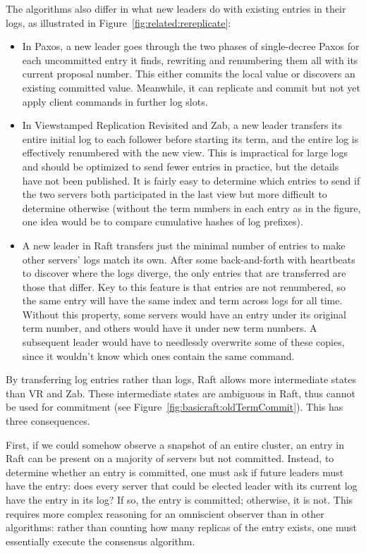 The algorithms also differ in what new leaders do with existing entries
in their logs, as illustrated in Figure~\ref{fig:related:rereplicate}:
%
\begin{itemize}
%
\item In Paxos, a new leader goes through the two phases of
single-decree Paxos for each uncommitted entry it finds, rewriting and
renumbering them all with its current proposal number. This either
commits the local value or discovers an existing committed value.
Meanwhile, it can replicate and commit but not yet apply client commands
in further log slots.
%
\item In Viewstamped Replication Revisited and Zab, a new leader
transfers its entire initial log to each follower before starting its
term, and the entire log is effectively renumbered with the new view.
This is impractical for large logs and should be optimized to send fewer
entries in practice, but the details have not been published. It is
fairly easy to determine which entries to send if the two servers both
participated in the last view but more difficult to determine otherwise
(without the term numbers in each entry as in the figure, one idea would
be to compare cumulative hashes of log prefixes).
%
\item
A new leader in Raft transfers just the minimal number of entries to
make other servers' logs match its own. After some back-and-forth with
heartbeats to discover where the logs diverge, the only entries that are
transferred are those that differ.
%
Key to this feature is that entries are not renumbered, so the same
entry will have the same index and term across logs for all time.
Without this property, some servers would have an entry under its
original term number, and others would have it under new term numbers. A
subsequent leader would have to needlessly overwrite some of these
copies, since it wouldn't know which ones contain the same command.
%
\end{itemize}

By transferring log entries rather than logs, Raft allows more
intermediate states than VR and Zab. These intermediate states
are ambiguous in Raft, thus cannot be used for commitment (see
Figure~\ref{fig:basicraft:oldTermCommit}). This has three
consequences.

First, if we could somehow observe a snapshot of an entire cluster, an
entry in Raft can be present on a majority of servers but not committed.
Instead, to determine whether an entry is committed, one must ask if
future leaders must have the entry: does every server that could be
elected leader with its current log have the entry in its log? If so,
the entry is committed; otherwise, it is not. This requires more complex
reasoning for an omniscient observer than in other algorithms: rather
than counting how many replicas of the entry exists, one must
essentially execute the consensus algorithm.

